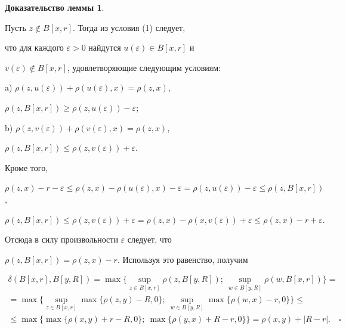 {\bf Доказательство леммы 1}.


Пусть $z \notin B[x,r]$. Тогда из условия (1) следует,


что для каждого $\varepsilon >0$ найдутся $u(\varepsilon ) \in B[x,r]$ и 


$v(\varepsilon ) \notin B[x,r]$, удовлетворяющие следующим условиям:





a) $\rho (z,u(\varepsilon )) + \rho (u(\varepsilon),x) = \rho (z,x)$, 


$\rho (z,B[x,r]) \geq \rho (z,u(\varepsilon )) - \varepsilon $;





b) $\rho (z,v(\varepsilon )) + \rho (v(\varepsilon),x) = \rho (z,x)$, 


$\rho (z,B[x,r]) \leq \rho (z,v(\varepsilon )) + \varepsilon $.





\noindent{}Кроме того, 


$\rho (z,x) - r - \varepsilon \leq \rho (z,x) -


\rho (u(\varepsilon ),x) - \varepsilon = 


\rho (z,u(\varepsilon )) - \varepsilon \leq \rho (z,B[x,r])$, 


$\rho (z,B[x,r]) \leq \rho (z,v(\varepsilon )) + \varepsilon


= \rho (z,x) - \rho (x,v(\varepsilon )) + \varepsilon \leq \rho (z,x) - r 


+ \varepsilon.$


Отсюда в силу произвольности $\varepsilon $ следует, что 


$\rho (z,B[x,r]) = \rho (z,x ) - r$. Используя это равенство, получим


\begin{multline*}


\delta (B[x,r],B[y,R]) = 


\max\{\sup_{z \in B[x,r]}{\rho(z,B[y,R])};


\ \sup_{w \in B[y,R]}{\rho(w,B[x,r])}\} = \\


%


=\max\{\sup_{z \in B[x,r]}{\max\{\rho(z,y) - R,0\}};


\ \sup_{w \in B[y,R]}{\max\{\rho(w,x)- r,0\}}\} \leq \\ 


%


\le \max\{\max\{\rho(x,y) + r - R,0\};\ \max\{\rho(y,x) + R - r,0\}\}


= \rho (x,y) + |R - r|.\quad\square


\end{multline*}





